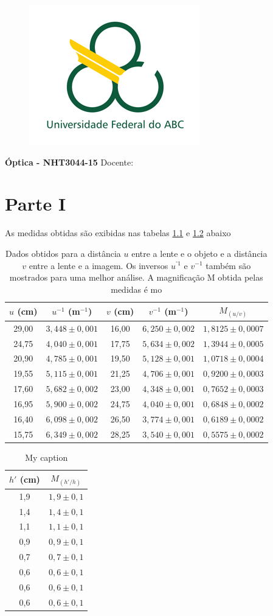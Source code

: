 \documentclass[report,12pt,openright,oneside,a4paper,brazil]{abntex2}
\date{Março de 2019}
\renewcommand{\imprimircapa}{%
\begin{capa}%
	\begin{figure}[ht]
		\centering
		\includegraphics[scale=0.6]{logo.jpg}
		\label{fig:logo}
	\end{figure}
	\begin{center}
		\textbf{\large Óptica - NHT3044-15}
		\vfill
    	{\LARGE\textbf{\imprimirtitulo}}
    	\vfill
    	Docente: \imprimirorientador
    	\vspace*{1cm}
		\imprimirautor
		\vfill
    	\imprimirlocal \\
    	\imprimirdata
	\end{center}
\end{capa}
}
\begin{document}
\imprimircapa


\chapter{Parte I}

As medidas obtidas são exibidas nas tabelas \ref{tab:uv} e \ref{tab:h'h} abaixo

\begin{table}[H]
\centering
\caption{Dados obtidos para a distância $u$ entre a lente e o objeto e a distância $v$ entre a lente e a imagem. Os inversos $u^{⁻1}$ e $v^{-1}$ também são mostrados para uma melhor análise. A magnificação M obtida pelas medidas é mo}
\label{tab:uv}
\begin{tabular}{|c|c|c|c|c|}
\hline
$u$ (cm) & $u^{-1}$ (m$^{-1}$) & $v$ (cm) & $v^{-1}$ (m$^{-1}$) & $M_{(u/v)}$ \\ \hline
29,00  &  $3,448 \pm 0,001$  &  16,00  &  $6,250 \pm 0,002$  &  $1,8125 \pm 0,0007$  \\ \hline
24,75  &  $4,040 \pm 0,001$  &  17,75  &  $5,634 \pm 0,002$  &  $1,3944 \pm 0,0005$  \\ \hline
20,90  &  $4,785 \pm 0,001$  &  19,50  &  $5,128 \pm 0,001$  &  $1,0718 \pm 0,0004$  \\ \hline
19,55  &  $5,115 \pm 0,001$  &  21,25  &  $4,706 \pm 0,001$  &  $0,9200 \pm 0,0003$  \\ \hline
17,60  &  $5,682 \pm 0,002$  &  23,00  &  $4,348 \pm 0,001$  &  $0,7652 \pm 0,0003$  \\ \hline
16,95  &  $5,900 \pm 0,002$  &  24,75  &  $4,040 \pm 0,001$  &  $0,6848 \pm 0,0002$  \\ \hline
16,40  &  $6,098 \pm 0,002$  &  26,50  &  $3,774 \pm 0,001$  &  $0,6189 \pm 0,0002$  \\ \hline
15,75  &  $6,349 \pm 0,002$  &  28,25  &  $3,540 \pm 0,001$  &  $0,5575 \pm 0,0002$  \\ \hline
\end{tabular}
\end{table}

\begin{table}[H]
\centering
\caption{My caption}
\label{tab:h'h}
\begin{tabular}{|c|c|}
\hline
$h'$ (cm) & $M_{(h'/h)}$ \\ \hline
1,9  & $1,9 \pm 0,1$  \\ \hline
1,4  & $1,4 \pm 0,1$  \\ \hline
1,1  & $1,1 \pm 0,1$  \\ \hline
0,9  & $0,9 \pm 0,1$  \\ \hline
0,7  & $0,7 \pm 0,1$  \\ \hline
0,6  & $0,6 \pm 0,1$  \\ \hline
0,6  & $0,6 \pm 0,1$  \\ \hline
0,6  & $0,6 \pm 0,1$  \\ \hline
\end{tabular}
\end{table}
\end{document}
